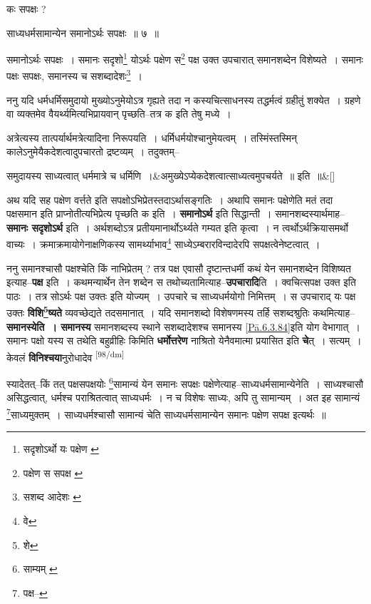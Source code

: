 \documentclass[article,12pt,a4paper]{memoir}
\begin{document}
	  \pstart कः सपक्षः ?
	\pend
       

	  \pstart साध्यधर्मसामान्येन समानोऽर्थः सपक्षः ॥ ७ ॥
	\pend
       

	  \pstart समानोऽर्थः सपक्षः । समानः सदृशो\footnote{सदृशोऽर्थो यः पक्षेण \cite{dp-msC}} योऽर्थः पक्षेण स\footnote{पक्षेण स सपक्ष \cite{dp-msB} \cite{dp-msC} \cite{dp-msD} \cite{dp-edP} \cite{dp-edH} \cite{dp-edE} \cite{dp-edN}} पक्ष उक्त उपचारात् समानशब्देन विशेष्यते । समानः पक्षः सपक्षः, समानस्य च सशब्दादेशः\footnote{सशब्द आदेशः \cite{dp-edE}} ।
	\pend
      

	  \pstart ननु यदि धर्मधर्मिसमुदायो मुख्योऽनुमेयोऽत्र गृह्यते तदा न कस्यचित्साधनस्य तद्धर्मत्वं ग्रहीतुं शक्येत । ग्रहणे वा व्यक्तमेव वैयर्थ्यमित्यभिप्रायवान् पृच्छति--तत्र क इति तेषु मध्ये ।
	\pend
      

	  \pstart अत्रेत्यस्य तात्पर्यार्थमत्रेत्यादिना निरूपयति । धर्मिधर्मयोश्चानुमेयत्वम् । तस्मिंस्तस्मिन् कालेऽनुमेयैकदेशत्वादुपचारतो द्रष्टव्यम् । तदुक्तम्--
	\pend
      
	    
	    \stanza[\smallbreak]
समुदायस्य साध्यत्वात् धर्ममात्रे च धर्मिणि ।&अमुख्येऽप्येकदेशत्वात्साध्यत्वमुपचर्यते ॥ इति ॥\&[\smallbreak]


	

	  \pstart अथ यदि सह पक्षेण वर्त्तते इति सपक्षोऽभिप्रेतस्तदाऽर्थासङ्गतिः । अथापि समानः पक्षेणेति मतं तदा पक्षसमान इति प्राप्नोतीत्यभिप्रेत्य पृच्छति क इति । \textbf{समानोऽर्थ} इति सिद्धान्ती । समानशब्दस्यार्थमाह--\textbf{समानः सदृशोऽर्थ} इति । अर्थशब्दोऽत्र प्रतीयमानार्थोऽर्थ्यते गम्यत इति कृत्वा । न त्वर्थोऽर्थक्रियासमर्थो वाच्यः । क्रमाक्रमायोगेनाक्षणिकस्य सामर्थ्याभाव\footnote{वे} साध्येऽम्बरारविन्दादेरपि सपक्षत्वेनेष्टत्वात् ।
	\pend
      

	  \pstart ननु समानश्चासौ पक्षश्चेति किं नाभिप्रेतम् ? तत्र पक्ष एवासौ दृष्टान्तधर्मी कथं येन समानशब्देन विशिष्यत इत्याह--\textbf{पक्ष} इति । कथमन्यार्थेन तेन शब्देन स तथोच्यतामित्याह--\textbf{उपचारादि}ति । क्वचित्सपक्ष उक्त इति पाठः । तत्र सोऽर्थः पक्ष उक्तः इति योज्यम् । उपचारे च साध्यधर्मयोगो निमित्तम् । स उपचाराद् यः पक्ष उक्तः \textbf{विशि\footnote{शे}ष्यते} व्यवच्छेद्यते तदसमानात् । यदि समानशब्दो विशेषणमस्य तर्हि सशब्दश्रुतिः कथमित्याह--\textbf{समानस्येति । समानस्य} समानशब्दस्य स्थाने सशब्दादेशश्च समानस्य \cref{Pā.6.3.84}इति योग वेभागात् । समानः पक्षो यस्य स तथेति बहुव्रीहिः किमिति \textbf{धर्मोत्तरेण} नाश्रितो येनैवमात्मा प्रयासित इति \textbf{चे}त् । सत्यम् । केवलं \textbf{विनिश्चया}नुरोधादेव  \leavevmode\textsuperscript{\rmlatinfont\tiny [98/dm]} 
	  
	स्यादेतत्--किं तत् पक्षसपक्षयोः \footnote{साम्यम् \cite{dp-msB}}सामान्यं येन समानः सपक्षः पक्षेणेत्याह--साध्यधर्मसामान्येनेति । साध्यश्चासौ असिद्धत्वात्, धर्मश्च पराश्रितत्वात् साध्यधर्मः । न च विशेषः साध्यः, अपि तु सामान्यम् । अत इह सामान्यं \footnote{पक्ष--\cite{dp-msD-n}}साध्यमुक्तम् । साध्यधर्मश्चासौ सामान्यं चेति साध्यधर्मसामान्येन समानः पक्षेण सपक्ष इत्यर्थः ॥ 
	  
\end{document}
